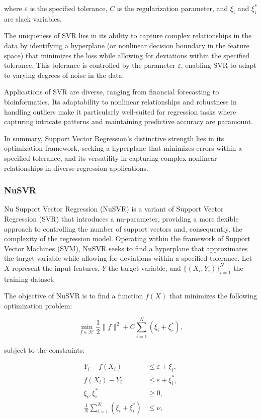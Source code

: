 \documentclass[twocolumn]{article}
\begin{document}
where \(\varepsilon\) is the specified tolerance, \(C\) is the regularization parameter, and \(\xi_i\) and \(\xi_i^*\) are slack variables.

The uniqueness of SVR lies in its ability to capture complex relationships in the data by identifying a hyperplane (or nonlinear decision boundary in the feature space) that minimizes the loss while allowing for deviations within the specified tolerance. This tolerance is controlled by the parameter \(\varepsilon\), enabling SVR to adapt to varying degrees of noise in the data.

Applications of SVR are diverse, ranging from financial forecasting to bioinformatics. Its adaptability to nonlinear relationships and robustness in handling outliers make it particularly well-suited for regression tasks where capturing intricate patterns and maintaining predictive accuracy are paramount.

In summary, Support Vector Regression's distinctive strength lies in its optimization framework, seeking a hyperplane that minimizes errors within a specified tolerance, and its versatility in capturing complex nonlinear relationships in diverse regression applications.

		\subsubsection{NuSVR}
Nu Support Vector Regression (NuSVR) is a variant of Support Vector Regression (SVR) that introduces a nu-parameter, providing a more flexible approach to controlling the number of support vectors and, consequently, the complexity of the regression model. Operating within the framework of Support Vector Machines (SVM), NuSVR seeks to find a hyperplane that approximates the target variable while allowing for deviations within a specified tolerance. Let \(X\) represent the input features, \(Y\) the target variable, and \(\{(X_i, Y_i)\}_{i=1}^{N}\) the training dataset.

The objective of NuSVR is to find a function \(f(X)\) that minimizes the following optimization problem:

\[ \min_{f \in \mathcal{H}} \frac{1}{2} \|f\|^2 + C \sum_{i=1}^{N} \left(\xi_i + \xi_i^*\right), \]

subject to the constraints:

\[
\begin{aligned}
Y_i - f(X_i) &\leq \varepsilon + \xi_i, \\
f(X_i) - Y_i &\leq \varepsilon + \xi_i^*, \\
\xi_i, \xi_i^* &\geq 0, \\
\frac{1}{N} \sum_{i=1}^{N} (\xi_i + \xi_i^*) &\leq \nu,
\end{aligned}
\]
\end{document}
